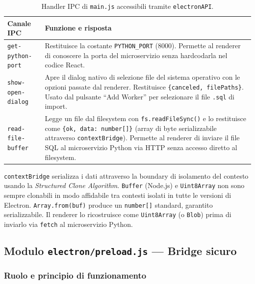 \documentclass[a4paper,12pt]{article}
\begin{document}
\begin{table}[H]
\centering\small
\caption{Handler IPC di \texttt{main.js} accessibili tramite \texttt{electronAPI}.}
\begin{tabular}{L{4.5cm} L{8cm}}
\toprule
\textbf{Canale IPC} & \textbf{Funzione e risposta} \\
\midrule
\texttt{get-python-port} &
  Restituisce la costante \texttt{PYTHON\_PORT} (8000). Permette
  al renderer di conoscere la porta del microservizio senza
  hardcodarla nel codice React. \\[3pt]
\texttt{show-open-dialog} &
  Apre il dialog nativo di selezione file del sistema operativo
  con le opzioni passate dal renderer. Restituisce
  \texttt{\{canceled, filePaths\}}.
  Usato dal pulsante ``Add Worker'' per selezionare il file
  \texttt{.sql} di import. \\[3pt]
\texttt{read-file-buffer} &
  Legge un file dal filesystem con \texttt{fs.readFileSync()}
  e lo restituisce come \texttt{\{ok, data: number[]\}}
  (array di byte serializzabile attraverso \texttt{contextBridge}).
  Permette al renderer di inviare il file SQL al microservizio
  Python via HTTP senza accesso diretto al filesystem. \\
\bottomrule
\end{tabular}
\end{table}

\begin{infobox}
\texttt{contextBridge} serializza i dati attraverso la boundary
di isolamento del contesto usando la \textit{Structured Clone Algorithm}.
\texttt{Buffer} (Node.js) e \texttt{Uint8Array} non sono sempre
clonabili in modo affidabile tra contesti isolati in tutte le versioni
di Electron. \texttt{Array.from(buf)} produce un \texttt{number[]}
standard, garantito serializzabile. Il renderer lo ricostruisce come
\texttt{Uint8Array} (o \texttt{Blob}) prima di inviarlo via
\texttt{fetch} al microservizio Python.
\end{infobox}

\subsection{Modulo \texttt{electron/\allowbreak preload.js} --- Bridge sicuro}

\subsubsection{Ruolo e principio di funzionamento}
\end{document}
